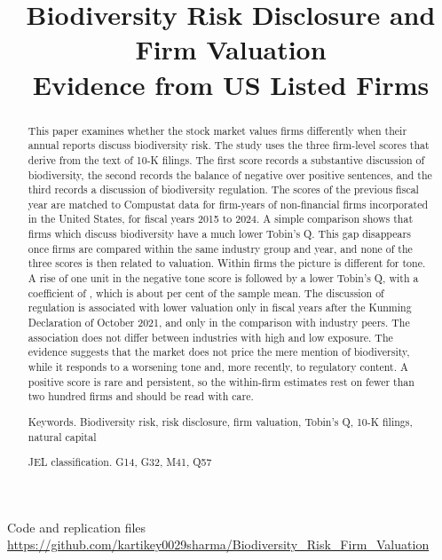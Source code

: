 \documentclass[12pt,a4paper]{article}
\title{Biodiversity Risk Disclosure and Firm Valuation\\[4pt] \large Evidence from US Listed Firms}
\author{}
\date{}
\begin{document}
\maketitle
\vspace{-5em} %
\begin{center}
{\small Code and replication files\\
\url{https://github.com/kartikey0029sharma/Biodiversity_Risk_Firm_Valuation}}
\end{center}

\begin{abstract}
\noindent This paper examines whether the stock market values firms differently when their annual reports discuss biodiversity risk. The study uses the three firm-level scores that \citet{giglio2026} derive from the text of 10-K filings. The first score records a substantive discussion of biodiversity, the second records the balance of negative over positive sentences, and the third records a discussion of biodiversity regulation. The scores of the previous fiscal year are matched to Compustat data for \nFinal{} firm-years of \nFirmsFinal{} non-financial firms incorporated in the United States, for fiscal years 2015 to 2024. A simple comparison shows that firms which discuss biodiversity have a much lower Tobin's Q. This gap disappears once firms are compared within the same industry group and year, and none of the three scores is then related to valuation. Within firms the picture is different for tone. A rise of one unit in the negative tone score is followed by a lower Tobin's Q, with a coefficient of \coefFAllNeg{}, which is about \effNegMean{} per cent of the sample mean. The discussion of regulation is associated with lower valuation only in fiscal years after the Kunming Declaration of October 2021, and only in the comparison with industry peers. The association does not differ between industries with high and low exposure. The evidence suggests that the market does not price the mere mention of biodiversity, while it responds to a worsening tone and, more recently, to regulatory content. A positive score is rare and persistent, so the within-firm estimates rest on fewer than two hundred firms and should be read with care.

\medskip
\noindent Keywords. Biodiversity risk, risk disclosure, firm valuation, Tobin's Q, 10-K filings, natural capital

\noindent JEL classification. G14, G32, M41, Q57
\end{abstract}
\end{document}
